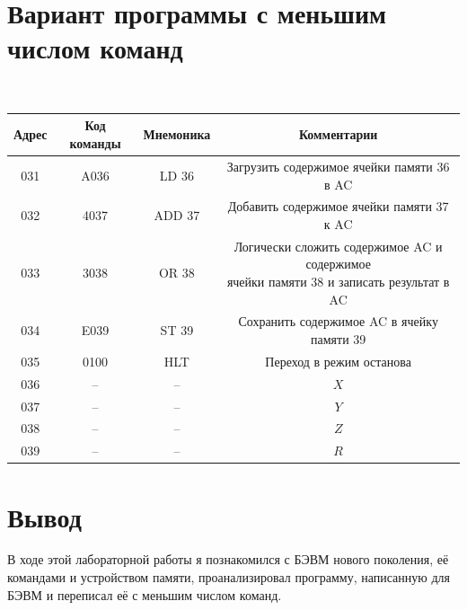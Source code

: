\documentclass[11pt,a4paper]{article}
\begin{document}
\section{Вариант программы с меньшим числом команд}
\begin{table}[H]
	{\tt
		\begin{tabular}{|c|c|c|c|}
			\hline
			\textbf{Адрес} & \textbf{Код команды} & \textbf{Мнемоника} &           \textbf{Комментарии}            \\ \hline
			031 & A036 & LD 36 & Загрузить содержимое ячейки памяти 36 в AC\\ \hline
			032 & 4037 & ADD 37 & Добавить содержимое ячейки памяти 37 к AC\\ \hline
			033 & 3038 & OR 38 & \makecell{Логически сложить содержимое AC и содержимое\\ ячейки памяти 38 и записать результат в AC}\\ \hline
			034 & E039 & ST 39 & Сохранить содержимое AC в ячейку памяти 39\\ \hline
			035 & 0100 & HLT & Переход в режим останова\\ \hline
			036 & -- & -- & $X$\\ \hline
			037 & -- & -- & $Y$\\ \hline
			038 & -- & -- & $Z$\\ \hline
			039 & -- & -- & $R$\\ \hline
		\end{tabular}
	}
\end{table}
\section{Вывод}
В ходе этой лабораторной работы я познакомился с БЭВМ нового поколения, её командами и устройством памяти, проанализировал программу, написанную для БЭВМ и переписал её с меньшим числом команд.
\end{document}
